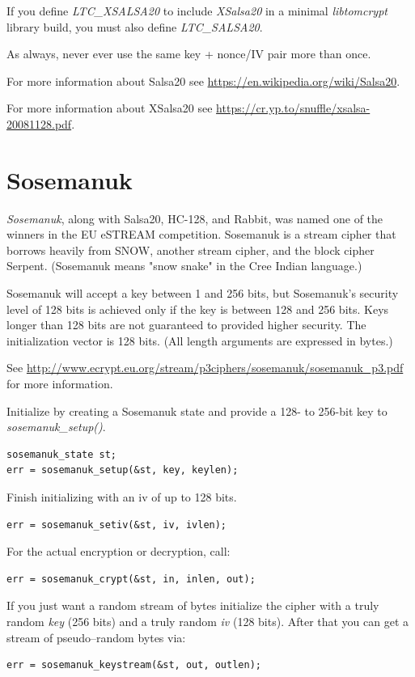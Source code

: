 \documentclass[synpaper]{book}
\newcommand{\mysection}[1]    %
	{                   %
	\section{#1}
   \markboth{\textsf{www.libtom.net}}{\thesection ~ {#1}}
	}
\begin{document}
If you define \textit{LTC\_XSALSA20} to include \textit{XSalsa20} in a minimal
\textit{libtomcrypt} library build, you must also define \textit{LTC\_SALSA20}.
\vspace{1mm}

As always, never ever use the same key + nonce/IV pair more than once.
\vspace{1mm}

For more information about Salsa20 see
\url{https://en.wikipedia.org/wiki/Salsa20}.
\vspace{1mm}

For more information about XSalsa20 see
\url{https://cr.yp.to/snuffle/xsalsa-20081128.pdf}.
\vspace{1mm}

\mysection{Sosemanuk}

\textit{Sosemanuk}, along with Salsa20, HC-128, and Rabbit, was named one of the winners in
the EU eSTREAM competition.  Sosemanuk is a stream cipher that borrows heavily from SNOW,
another stream cipher, and the block cipher Serpent.  (Sosemanuk means "snow snake" in the
Cree Indian language.)

Sosemanuk will accept a key between 1 and 256 bits, but Sosemanuk's security level of 128
bits is achieved only if the key is between 128 and 256 bits.  Keys longer than 128 bits
are not guaranteed to provided higher security.  The initialization vector is 128 bits.
(All length arguments are expressed in bytes.)

See \url{http://www.ecrypt.eu.org/stream/p3ciphers/sosemanuk/sosemanuk_p3.pdf} for more
information.

Initialize by creating a Sosemanuk state and provide a 128- to 256-bit key to \textit{sosemanuk\_setup()}.
\begin{verbatim}
sosemanuk_state st;
err = sosemanuk_setup(&st, key, keylen);
\end{verbatim}

Finish initializing with an iv of up to 128 bits.
\begin{verbatim}
err = sosemanuk_setiv(&st, iv, ivlen);
\end{verbatim}

For the actual encryption or decryption, call:
\begin{verbatim}
err = sosemanuk_crypt(&st, in, inlen, out);
\end{verbatim}

If you just want a random stream of bytes initialize the cipher with a truly random
\textit{key} (256 bits) and a truly random \textit{iv} (128 bits). After that you can
get a stream of pseudo--random bytes via:
\begin{verbatim}
err = sosemanuk_keystream(&st, out, outlen);
\end{verbatim}
\end{document}
